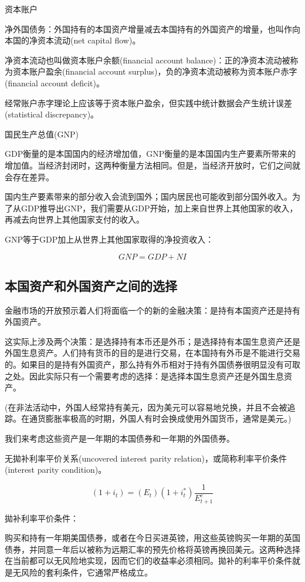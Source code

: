 \documentclass{article}
\begin{document}
\hspace*{\fill}

资本账户


净外国债务：外国持有的本国资产增量减去本国持有的外国资产的增量，也叫作向本国的净资本流动(net capital flow)。

净资本流动也叫做资本账户余额(financial account balance)：正的净资本流动被称为资本账户盈余(financial account surplus)，负的净资本流动被称为资本账户赤字(financial account deficit)。

经常账户赤字理论上应该等于资本账户盈余，但实践中统计数据会产生统计误差(statistical discrepancy)。


国民生产总值(GNP)

GDP衡量的是本国国内的经济增加值，GNP衡量的是本国国内生产要素所带来的增加值。当经济封闭时，这两种衡量方法相同。但是，当经济开放时，它们之间就会存在差异。

国内生产要素带来的部分收入会流到国外；国内居民也可能收到部分国外收入。为了从GDP推导出GNP，我们需要从GDP开始，加上来自世界上其他国家的收入，再减去向世界上其他国家支付的收入。

GNP等于GDP加上从世界上其他国家取得的净投资收入：

\[
GNP=GDP+NI
\]

\subsection{本国资产和外国资产之间的选择}

金融市场的开放预示着人们将面临一个的新的金融决策：是持有本国资产还是持有外国资产。

这实际上涉及两个决策：是选择持有本币还是外币；是选择持有本国生息资产还是外国生息资产。人们持有货币的目的是进行交易，在本国持有外币是不能进行交易的。如果目的是持有外国资产，那么持有外币相对于持有外国债券很明显没有可取之处。因此实际只有一个需要考虑的选择：是选择本国生息资产还是外国生息资产。

(在非法活动中，外国人经常持有美元，因为美元可以容易地兑换，并且不会被追踪。在通货膨胀率极高的时期，外国人有时会换成使用外国货币，通常是美元。)

我们来考虑这些资产是一年期的本国债券和一年期的外国债券。

无拋补利率平价关系(uncovered interest parity relation)，或简称利率平价条件(interest parity condition)。

\[
(1+i_t)=(E_t)(1+i^*_t)\frac{1}{E^e_{t+1}}
\]

拋补利率平价条件：

购买和持有一年期美国债券，或者在今日买进英镑，用这些英镑购买一年期的英国债券，并同意一年后以被称为远期汇率的预先价格将英镑再换回美元。这两种选择在当前都可以无风险地实现，因而它们的收益率必须相同。拋补的利率平价条件就是无风险的套利条件，它通常严格成立。
\end{document}
